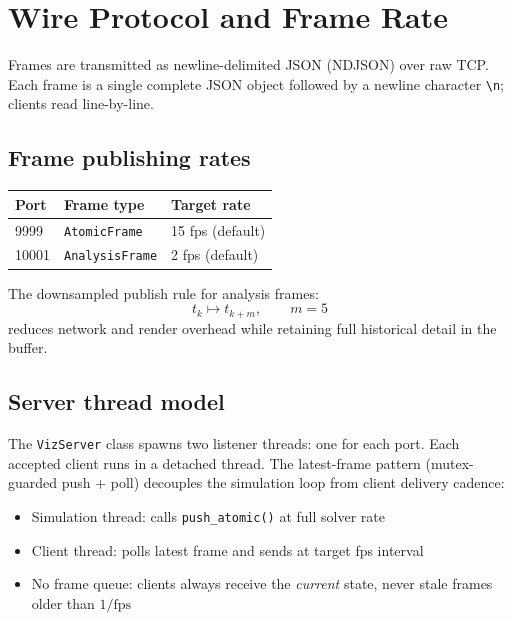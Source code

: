 ﻿\documentclass[11pt]{article}
\begin{document}
\section{Wire Protocol and Frame Rate}
\label{sec:protocol}

Frames are transmitted as newline-delimited JSON (NDJSON) over raw TCP.
Each frame is a single complete JSON object followed by a newline character
\texttt{\textbackslash n}; clients read line-by-line.

\subsection{Frame publishing rates}

\begin{center}
\begin{tabular}{lll}
\toprule
Port & Frame type & Target rate \\
\midrule
9999  & \texttt{AtomicFrame}   & 15 fps (default) \\
10001 & \texttt{AnalysisFrame} & 2 fps (default) \\
\bottomrule
\end{tabular}
\end{center}

The downsampled publish rule for analysis frames:
\begin{equation}
  t_k \mapsto t_{k+m}, \qquad m = 5
\end{equation}
reduces network and render overhead while retaining full historical detail
in the buffer.

\subsection{Server thread model}

The \texttt{VizServer} class spawns two listener threads:
one for each port.  Each accepted client runs in a detached thread.
The latest-frame pattern (mutex-guarded push + poll) decouples the
simulation loop from client delivery cadence:
\begin{itemize}[noitemsep]
  \item Simulation thread: calls \texttt{push\_atomic()} at full solver rate
  \item Client thread: polls latest frame and sends at target fps interval
  \item No frame queue: clients always receive the \emph{current} state,
        never stale frames older than $1/\mathrm{fps}$
\end{itemize}
\end{document}

